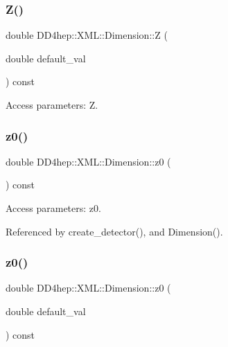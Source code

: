 \subsubsection{\texorpdfstring{Z()}{Z()}\hspace{0.1cm}{\footnotesize\ttfamily [2/2]}}
{\footnotesize\ttfamily double D\+D4hep\+::\+X\+M\+L\+::\+Dimension\+::Z (\begin{DoxyParamCaption}\item[{double}]{default\+\_\+val }\end{DoxyParamCaption}) const}



Access parameters\+: Z. 

\hypertarget{struct_d_d4hep_1_1_x_m_l_1_1_dimension_a54e4bc9f9049160f2466ad75a816a9c0}{}\label{struct_d_d4hep_1_1_x_m_l_1_1_dimension_a54e4bc9f9049160f2466ad75a816a9c0} 
\subsubsection{\texorpdfstring{z0()}{z0()}\hspace{0.1cm}{\footnotesize\ttfamily [1/2]}}
{\footnotesize\ttfamily double D\+D4hep\+::\+X\+M\+L\+::\+Dimension\+::z0 (\begin{DoxyParamCaption}{ }\end{DoxyParamCaption}) const}



Access parameters\+: z0. 



Referenced by create\+\_\+detector(), and Dimension().

\hypertarget{struct_d_d4hep_1_1_x_m_l_1_1_dimension_a0112890602b0953d7f8b23d4520a3171}{}\label{struct_d_d4hep_1_1_x_m_l_1_1_dimension_a0112890602b0953d7f8b23d4520a3171} 
\subsubsection{\texorpdfstring{z0()}{z0()}\hspace{0.1cm}{\footnotesize\ttfamily [2/2]}}
{\footnotesize\ttfamily double D\+D4hep\+::\+X\+M\+L\+::\+Dimension\+::z0 (\begin{DoxyParamCaption}\item[{double}]{default\+\_\+val }\end{DoxyParamCaption}) const}



